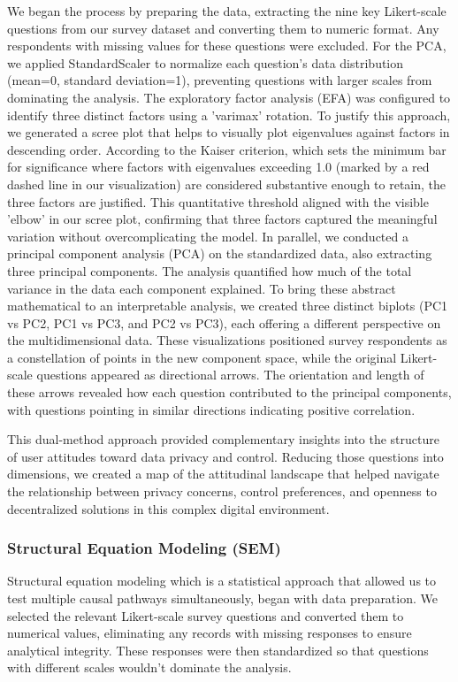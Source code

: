 	We began the process by preparing the data, extracting the nine key Likert-scale questions from our survey dataset and converting them to numeric format. Any respondents with missing values for these questions were excluded. For the PCA, we applied StandardScaler to normalize each question's data distribution (mean=0, standard deviation=1), preventing questions with larger scales from dominating the analysis. 
	The exploratory factor analysis (EFA) was configured to identify three distinct factors using a 'varimax' rotation. To justify this approach, we generated a scree plot that helps to visually plot eigenvalues against factors in descending order. According to the Kaiser criterion, which sets the minimum bar for significance where factors with eigenvalues exceeding 1.0 (marked by a red dashed line in our visualization) are considered substantive enough to retain, the three factors are justified. This quantitative threshold aligned with the visible 'elbow' in our scree plot, confirming that three factors captured the meaningful variation without overcomplicating the model.	
	In parallel, we conducted a principal component analysis (PCA) on the standardized data, also extracting three principal components. The analysis quantified how much of the total variance in the data each component explained. To bring these abstract mathematical to an interpretable analysis, we created three distinct biplots (PC1 vs PC2, PC1 vs PC3, and PC2 vs PC3), each offering a different perspective on the multidimensional data. These visualizations positioned survey respondents as a constellation of points in the new component space, while the original Likert-scale questions appeared as directional arrows. The orientation and length of these arrows revealed how each question contributed to the principal components, with questions pointing in similar directions indicating positive correlation.

	This dual-method approach provided complementary insights into the structure of user attitudes toward data privacy and control. Reducing those questions into dimensions, we created a map of the attitudinal landscape that helped navigate the relationship between privacy concerns, control preferences, and openness to decentralized solutions in this complex digital environment.
	\subsubsection{Structural Equation Modeling (SEM)}
	Structural equation modeling which is a statistical approach that allowed us to test multiple causal pathways simultaneously, began with data preparation. We selected the relevant Likert-scale survey questions and converted them to numerical values, eliminating any records with missing responses to ensure analytical integrity. These responses were then standardized so that questions with different scales wouldn't dominate the analysis.
	
